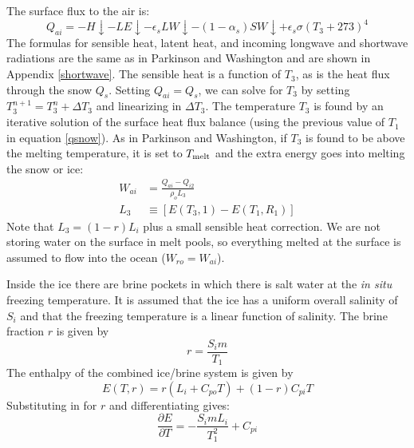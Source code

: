The surface flux to the air is:
\begin{equation}
   Q_{ai} =  - H\!\downarrow - LE\!\downarrow -
       \epsilon_s LW\!\!\downarrow  -
      (1 - \alpha_s) SW\!\!\downarrow + \epsilon_s \sigma (T_3+273)^4
\end{equation}
The formulas for sensible heat, latent heat, and incoming longwave and
shortwave radiations are the same as in Parkinson and Washington
\cite{Parkinson} and
are shown in Appendix \ref{shortwave}. The sensible heat is a function
of $T_3$, as is the heat flux through the snow $Q_s$. Setting $Q_{ai} =
Q_s$, we can solve for $T_3$ by setting $T_3^{n+1} = T_3^n + \Delta
T_3$ and linearizing in $\Delta T_3$.  The temperature $T_3$ is found by
an iterative solution of the surface heat flux balance (using the
previous value of $T_1$ in equation \ref{qsnow}). As in Parkinson and
Washington, if $T_3$ is found to be above the melting temperature, it
is set to $T_{\rm melt}$ and the extra energy goes into melting the
snow or ice:
\begin{align}
   W_{ai} & = \frac{Q_{ai} - Q_{i2} }{ \rho_o L_3} \\
   L_3 & \equiv \left[ E(T_3,1) - E(T_1, R_1) \right]
\end{align}
Note that $L_3 = (1-r)L_i$ plus a small sensible heat correction.
We are not storing water on the surface in melt pools, so everything
melted at the surface is assumed to flow into the ocean ($W_{ro} =
W_{ai}$).

Inside the ice there are brine pockets in which there is salt water
at the {\it in situ} freezing temperature. It is assumed that the ice
has a uniform overall salinity of $S_i$ and that the freezing
temperature is a linear function of salinity. The brine fraction $r$ is
given by
$$
  r = \frac{S_i m }{ T_1}
$$
The enthalpy of the combined ice/brine system is given by
\begin{equation}
  E(T,r) = r(L_i + C_{po}T) + (1-r) C_{pi} T
\end{equation}
Substituting in for $r$ and differentiating gives:
\begin{equation}
  \frac{\partial E }{ \partial T} = - \frac{S_i m L_i }{ T_1^2} + C_{pi}
\end{equation}

